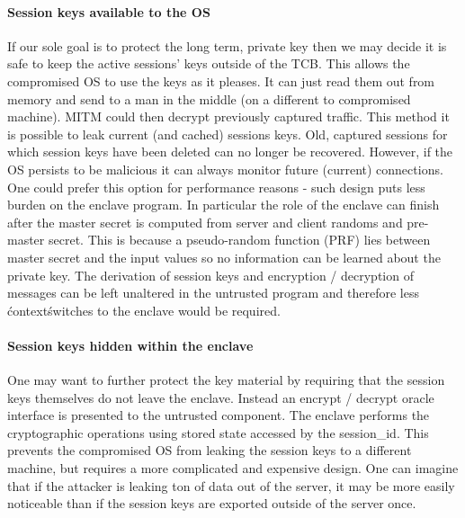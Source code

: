 \documentclass[../main.tex]{subfiles}
\begin{document}


\paragraph{Session keys available to the OS}

If our sole goal is to protect the long term, private key then we may
decide it is safe to keep the active sessions' keys outside of the
TCB. This allows the compromised OS to use the keys as it pleases. It
can just read them out from memory and send to a man in the middle (on
a different to compromised machine). MITM could then decrypt
previously captured traffic. This method it is possible to leak
current (and cached) sessions keys. Old, captured sessions for which
session keys have been deleted can no longer be recovered. However, if
the OS persists to be malicious it can always monitor future (current)
connections.\\

\noindent
One could prefer this option for performance reasons - such design
puts less burden on the enclave program. In particular the role of the
enclave can finish after the master secret is computed from server and
client randoms and pre-master secret. This is because a pseudo-random
function (PRF) lies between master secret and the input values so no
information can be learned about the private key. The derivation of
session keys and encryption / decryption of messages can be left
unaltered in the untrusted program and therefore less \'context\'
switches to the enclave would be required.

\paragraph{Session keys hidden within the enclave}

One may want to further protect the key material by requiring that the
session keys themselves do not leave the enclave. Instead an encrypt /
decrypt oracle interface is presented to the untrusted component. The
enclave performs the cryptographic operations using stored state
accessed by the session\_id. This prevents the compromised OS from
leaking the session keys to a different machine, but requires a more
complicated and expensive design. One can imagine that if the attacker
is leaking ton of data out of the server, it may be more easily
noticeable than if the session keys are exported outside of the server
once.\\
\end{document}
